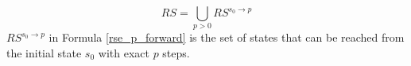 \documentclass[journal]{IEEEtran}
\begin{document}
\begin{equation}\label{rse}
RS =\bigcup_{p>0} RS^{s_0\to p}
\end{equation}
%
%
%
%
%
%
$RS^{s_0\to p}$ in Formula \ref{rse_p_forward} is the set of states that can be reached from the initial state $s_0$ with exact $p$ steps.

\end{document}
